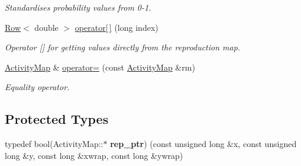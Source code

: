 \begin{DoxyCompactItemize}
\begin{DoxyCompactList}\small\item\em Standardises probability values from 0-\/1. \end{DoxyCompactList}\item 
\hyperlink{class_row}{Row}$<$ double $>$ \hyperlink{class_activity_map_a92b1a1dfcb284044e663d9df9e620986}{operator\mbox{[}$\,$\mbox{]}} (long index)
\begin{DoxyCompactList}\small\item\em Operator \mbox{[}\mbox{]} for getting values directly from the reproduction map. \end{DoxyCompactList}\item 
\hyperlink{class_activity_map}{Activity\+Map} \& \hyperlink{class_activity_map_a34a91ee0910bece045c0351e8781a023}{operator=} (const \hyperlink{class_activity_map}{Activity\+Map} \&rm)
\begin{DoxyCompactList}\small\item\em Equality operator. \end{DoxyCompactList}\end{DoxyCompactItemize}
\subsection*{Protected Types}
\begin{DoxyCompactItemize}
\item 
typedef bool(Activity\+Map\+::$\ast$ {\bfseries rep\+\_\+ptr}) (const unsigned long \&x, const unsigned long \&y, const long \&xwrap, const long \&ywrap)\hypertarget{class_activity_map_a0351c3b97323eaa3d3fea8ff72859eae}{}\label{class_activity_map_a0351c3b97323eaa3d3fea8ff72859eae}

\end{DoxyCompactItemize}
